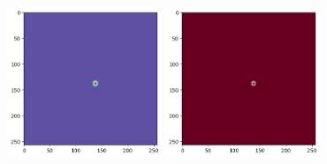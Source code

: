 \begin{center}
\includegraphics[height=4.5cm]{python_codes/fieldstone_171/results/nu2_solution_final_u.png}
\includegraphics[height=4.5cm]{python_codes/fieldstone_171/results/nu2_solution_final_v.png}
\end{center}

